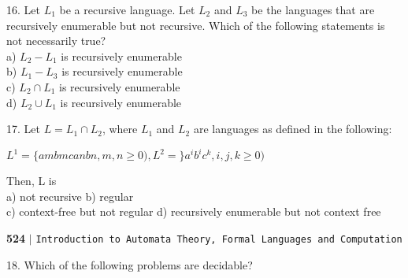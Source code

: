 \documentclass[11pt]{article}
\begin{document}
16. Let $L _{1}$ be a recursive language. Let $L _{2}$ and $L _{3}$ be the languages that are recursively enumerable but
not recursive. Which of the following statements is not necessarily true?\\
\hspace*{0.5cm} a) $L _{2} - L _{1}$ is recursively enumerable\\
\hspace*{0.5cm} b) $L _{1} - L _{3}$ is recursively enumerable\\
\hspace*{0.5cm} c) $L _{2} \cap L _{1}$ is recursively enumerable\\
\hspace*{0.5cm} d) $L _{2} \cup L _{1}$ is recursively enumerable\\
\vspace*{0.2cm}

\hspace*{-0.4cm}
17. Let $L = L _{1} \cap L _{2}$, where $L _{1}$ and $L _{2}$ are languages as defined in the following:\\
\vspace*{0.1cm}

\begin{center}
  $L ^{1} = \{ambmcanbn, m, n \geq 0), L ^{2} = \}a ^{i} b ^{i} c ^{k}, i, j, k \geq 0)$\\
\end{center}

Then, L is\\

\vspace*{0.1cm}
\hspace*{0.5cm} a) not recursive  \hspace*{2.5cm}  b) regular\\
\hspace*{0.5cm} c) context-free but not regular   \hspace*{0.5cm} d) recursively enumerable but not context free\\

\newpage
\begin{flushleft}
    \textbf{524}\hspace*{0.1cm} \textbf{$|$} \hspace*{0.1cm} \texttt{Introduction to Automata Theory, Formal Languages and Computation}
  \end{flushleft}
  \vspace*{0.5cm}

\hspace*{-0.4cm}
18. Which of the following problems are decidable?\\
\vspace*{0.1cm}
\end{document}
